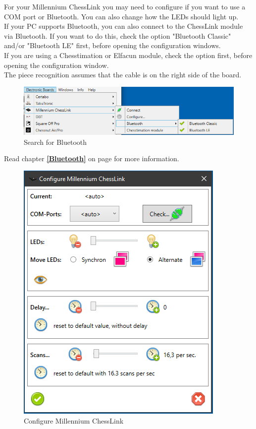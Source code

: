 \documentclass[11pt,a4paper]{article}
\begin{document}
For your Millennium ChessLink you may need to configure if you want to use a COM port or Bluetooth. You can also change how the LEDs should light up.\\
If your PC supports Bluetooth, you can also connect to the ChessLink module via Bluetooth. If you want to do this, check the option "Bluetooth Classic" and/or "Bluetooth LE" first, before opening the configuration windows.\\
If you are using a Chesstimation or Elfacun module, check the option first, before opening the configuration window.\\
The piece recognition assumes that the cable is on the right side of the board.

\begin{figure}[H]
	\centering
	\includegraphics[scale=0.7]{MillenniumChessLink9.png}
	\caption{Search for Bluetooth}
	\label{fig:MillenniumChessLink9}
\end{figure}
Read chapter \textbf{\ref{Bluetooth}  } on page \pageref{Bluetooth} for more information.

\begin{figure}[H]
	\centering
	\includegraphics[scale=0.9]{MillenniumChessLink2.png}
	\caption{Configure Millennium ChessLink}
	\label{fig:MillenniumChessLink2}
\end{figure}
\end{document}
